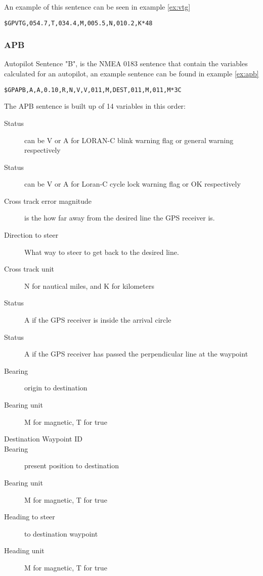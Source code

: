 An example of this sentence can be seen in example \ref{ex:vtg}
\begin{ex}
\texttt{\$GPVTG,054.7,T,034.4,M,005.5,N,010.2,K*48}
\label{ex:vtg}
\end{ex}

\subsubsection{APB}
Autopilot Sentence "B", is the NMEA 0183 sentence that contain the variables calculated for an autopilot, an example sentence can be found in example \ref{ex:apb}

\begin{ex}
\texttt{\$GPAPB,A,A,0.10,R,N,V,V,011,M,DEST,011,M,011,M*3C }
\label{ex:apb}
\end{ex}

The APB sentence is built up of 14 variables in this order:
\begin{description}
\item[Status] can be V or A for LORAN-C blink warning flag or general warning respectively 
\item[Status] can be V or A for Loran-C cycle lock warning flag or OK respectively
\item[Cross track error magnitude] is the how far away from the desired line the GPS receiver is.  
\item[Direction to steer] What way to steer to get back to the desired line.
\item[Cross track unit] N for nautical miles, and K for kilometers
\item[Status] A if the GPS receiver is inside the arrival circle
\item[Status] A if the GPS receiver has passed the perpendicular line at the waypoint
\item[Bearing] origin to destination 
\item[Bearing unit] M for magnetic, T for true
\item[Destination Waypoint ID]
\item[Bearing] present position to destination 
\item[Bearing unit] M for magnetic, T for true
\item[Heading to steer] to destination waypoint 
\item[Heading unit] M for magnetic, T for true
\end{description}






